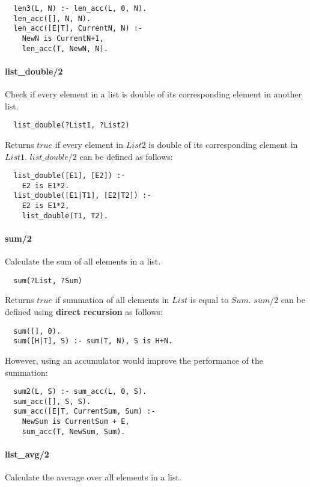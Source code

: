\documentclass{article}
\begin{document}
\begin{multicols}{2}
  \begin{lstlisting} 
  len3(L, N) :- len_acc(L, 0, N).
  len_acc([], N, N).
  len_acc([E|T], CurrentN, N) :-
	NewN is CurrentN+1,
	len_acc(T, NewN, N).
  \end{lstlisting}  
  
  \paragraph{list\_double/2} Check if every element in a list is double of its corresponding element in another list.
  
  \begin{lstlisting}
  list_double(?List1, ?List2)
  \end{lstlisting} 
  
  Returns $true$ if every element in $List2$ is double of its corresponding element in $List1$. $list\_double/2$ can be defined as follows:

  \begin{lstlisting}
  list_double([E1], [E2]) :-
    E2 is E1*2.
  list_double([E1|T1], [E2|T2]) :-
    E2 is E1*2,
    list_double(T1, T2).
  \end{lstlisting} 
  
  \paragraph{sum/2} Calculate the sum of all elements in a list.
  
  \begin{lstlisting}
  sum(?List, ?Sum)
  \end{lstlisting} 
  
  Returns $true$ if summation of all elements in $List$ is equal to $Sum$. $sum/2$ can be defined using {\bf direct recursion} as follows:

  \begin{lstlisting}
  sum([], 0).
  sum([H|T], S) :- sum(T, N), S is H+N.
  \end{lstlisting} 
  
  However, using an accumulator would improve the performance of the summation:
  
  \begin{lstlisting}
  sum2(L, S) :- sum_acc(L, 0, S).
  sum_acc([], S, S).
  sum_acc([E|T, CurrentSum, Sum) :-
    NewSum is CurrentSum + E,
    sum_acc(T, NewSum, Sum).
  \end{lstlisting} 
  
  \paragraph{list\_avg/2} Calculate the average over all elements in a list.
  

\end{multicols}
\end{document}
